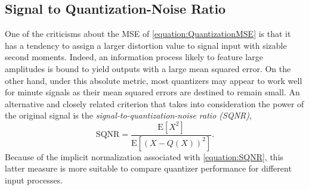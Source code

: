 \subsection{Signal to Quantization-Noise Ratio}

One of the criticisms about the MSE of \eqref{equation:QuantizationMSE} is that it has a tendency to assign a larger distortion value to signal input with sizable second moments.
Indeed, an information process likely to feature large amplitudes is bound to yield outputs with a large mean squared error.
On the other hand, under this absolute metric, most quantizers may appear to work well for minute signals as their mean squared errors are destined to remain small.
An alternative and closely related criterion that takes into consideration the power of the original signal is the \emph{signal-to-quantization-noise ratio (SQNR)},
\begin{equation} \label{equation:SQNR}
\text{SQNR}
= \frac{\mathrm{E} \left[ X^2 \right]}{\mathrm{E} \left[ (X - Q(X))^2 \right]} .
\end{equation}
Because of the implicit normalization associated with \eqref{equation:SQNR}, this latter measure is more suitable to compare quantizer performance for different input processes.

